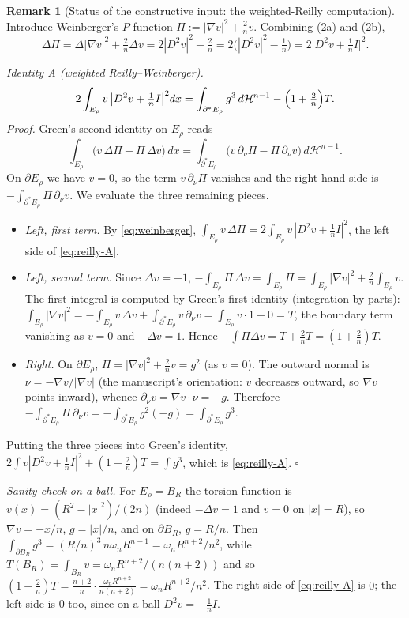 \documentclass[11pt]{amsart}
\theoremstyle{definition}
\newtheorem{remark}[theorem]{Remark}
\newcommand{\Hn}{\mathcal H^{n-1}}
\begin{document}
\begin{remark}[Status of the constructive input: the weighted-Reilly computation]
Introduce Weinberger's \(P\)-function \(\Pi:=|\nabla v|^2+\tfrac2n v\).  Combining
(2a) and (2b),
\begin{equation}\label{eq:weinberger}
   \Delta\Pi=\Delta|\nabla v|^2+\tfrac2n\Delta v
   =2|D^2v|^2-\tfrac2n=2\bigl(|D^2v|^2-\tfrac1n\bigr)
   =2\bigl|D^2v+\tfrac1n I\bigr|^2 .
\end{equation}

\emph{Identity A (weighted Reilly--Weinberger).}
\begin{equation}\label{eq:reilly-A}
   2\int_{E_\rho}v\,\bigl|D^2v+\tfrac1n I\bigr|^2dx
   =\int_{\partial^*E_\rho}g^3\,d\Hn-\Bigl(1+\tfrac2n\Bigr)T.
\end{equation}
\emph{Proof.}  Green's second identity on \(E_\rho\) reads
\[
   \int_{E_\rho}\bigl(v\,\Delta\Pi-\Pi\,\Delta v\bigr)\,dx
   =\int_{\partial^*E_\rho}\bigl(v\,\partial_\nu\Pi-\Pi\,\partial_\nu v\bigr)\,d\Hn .
\]
On \(\partial E_\rho\) we have \(v=0\), so the term \(v\,\partial_\nu\Pi\)
vanishes and the right-hand side is \(-\int_{\partial^*E_\rho}\Pi\,\partial_\nu
v\).  We evaluate the three remaining pieces.
\begin{itemize}[leftmargin=1.6em]
\item \emph{Left, first term.}  By \eqref{eq:weinberger},
\(\int_{E_\rho}v\,\Delta\Pi=2\int_{E_\rho}v\,|D^2v+\tfrac1n I|^2\), the left side
of \eqref{eq:reilly-A}.
\item \emph{Left, second term.}  Since \(\Delta v=-1\),
\(-\int_{E_\rho}\Pi\,\Delta v=\int_{E_\rho}\Pi
=\int_{E_\rho}|\nabla v|^2+\tfrac2n\int_{E_\rho}v\).  The first integral is
computed by Green's first identity (integration by parts):
\(\int_{E_\rho}|\nabla v|^2=-\int_{E_\rho}v\,\Delta v+\int_{\partial^*E_\rho}
v\,\partial_\nu v=\int_{E_\rho}v\cdot1+0=T\), the boundary term vanishing as
\(v=0\) and \(-\Delta v=1\).
Hence \(-\int\Pi\Delta v=T+\tfrac2nT=(1+\tfrac2n)T\).
\item \emph{Right.}  On \(\partial E_\rho\), \(\Pi=|\nabla v|^2+\tfrac2n v=g^2\)
(as \(v=0\)).  The outward normal is \(\nu=-\nabla v/|\nabla v|\) (the manuscript's
orientation: \(v\) decreases outward, so \(\nabla v\) points inward), whence
\(\partial_\nu v=\nabla v\cdot\nu=-g\).  Therefore
\(-\int_{\partial^*E_\rho}\Pi\,\partial_\nu v
=-\int_{\partial^*E_\rho}g^2(-g)=\int_{\partial^*E_\rho}g^3\).
\end{itemize}
Putting the three pieces into Green's identity,
\(2\int v|D^2v+\tfrac1n I|^2+(1+\tfrac2n)T=\int g^3\), which is
\eqref{eq:reilly-A}. \hfill\(\square\)

\emph{Sanity check on a ball.}  For \(E_\rho=B_R\) the torsion function is
\(v(x)=(R^2-|x|^2)/(2n)\) (indeed \(-\Delta v=1\) and \(v=0\) on \(|x|=R\)), so
\(\nabla v=-x/n\), \(g=|x|/n\), and on \(\partial B_R\), \(g=R/n\).  Then
\(\int_{\partial B_R}g^3=(R/n)^3\,n\omega_nR^{n-1}=\omega_nR^{n+2}/n^2\), while
\(T(B_R)=\int_{B_R}v=\omega_nR^{n+2}/(n(n+2))\) and so
\((1+\tfrac2n)T=\tfrac{n+2}{n}\cdot\frac{\omega_nR^{n+2}}{n(n+2)}
=\omega_nR^{n+2}/n^2\).  The right side of \eqref{eq:reilly-A} is \(0\); the left
side is \(0\) too, since on a ball \(D^2v=-\tfrac1n I\).  \checkmark


\end{remark}
\end{document}
